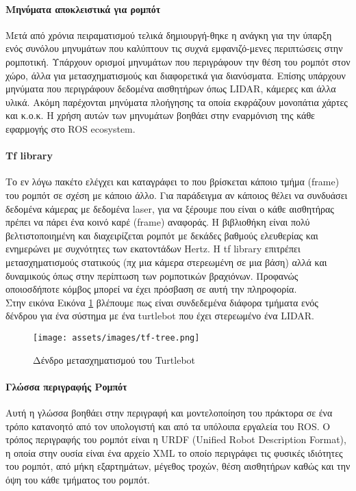 \paragraph{Μηνύματα αποκλειστικά για ρομπότ}
	Μετά από χρόνια πειραματισμού τελικά δημιουργή-θηκε η ανάγκη για την ύπαρξη ενός 
συνόλου μηνυμάτων που καλύπτουν τις συχνά εμφανιζό-μενες περιπτώσεις στην ρομποτική. Υπάρχουν ορισμοί μηνυμάτων που περιγράφουν την θέση του ρομπότ στον χώρο, άλλα για μετασχηματισμούς και διαφορετικά για διανύσματα. Επίσης υπάρχουν μηνύματα που περιγράφουν δεδομένα αισθητήρων όπως LIDAR, κάμερες και άλλα υλικά. Ακόμη παρέχονται μηνύματα πλοήγησης τα οποία εκφράζουν μονοπάτια χάρτες και κ.ο.κ. Η χρήση αυτών των μηνυμάτων βοηθάει στην εναρμόνιση της κάθε εφαρμογής στο ROS ecosystem. \\


\paragraph{Tf library} 
Το εν λόγω πακέτο ελέγχει και καταγράφει το που βρίσκεται κάποιο τμήμα (frame) του ρομπότ σε σχέση με κάποιο άλλο. Για παράδειγμα αν κάποιος θέλει να συνδυάσει δεδομένα κάμερας με δεδομένα laser, για να ξέρουμε που είναι ο κάθε αισθητήρας πρέπει να πάρει ένα κοινό καρέ (frame) αναφοράς. 
Η βιβλιοθήκη είναι πολύ βελτιστοποιημένη και διαχειρίζεται ρομπότ με δεκάδες βαθμούς ελευθερίας και ενημερώνει με συχνότητες των εκατοντάδων Hertz. Η tf library επιτρέπει μετασχηματισμούς στατικούς (πχ μια κάμερα στερεωμένη σε μια βάση) αλλά και δυναμικούς όπως στην περίπτωση των ρομποτικών βραχιόνων. Προφανώς οποιοσδήποτε κόμβος μπορεί να έχει πρόσβαση σε αυτή την πληροφορία.\\
Στην εικόνα Εικόνα \ref{fig:turtlebot tf} βλέπουμε πως είναι συνδεδεμένα διάφορα τμήματα ενός δένδρου για ένα σύστημα με ένα turtlebot που έχει στερεωμένο ένα LIDAR.
\begin{figure}[!ht]
	\centering
	\texttt{[image: assets/images/tf-tree.png]}
	\caption{Δένδρο μετασχηματισμού του Turtlebot}
	\label{fig:turtlebot tf}
\end{figure}

\paragraph{Γλώσσα περιγραφής Ρομπότ} 
	Αυτή η γλώσσα βοηθάει στην περιγραφή και μοντελοποίηση του πράκτορα σε ένα τρόπο 
κατανοητό από τον υπολογιστή και από τα υπόλοιπα εργαλεία του ROS. Ο τρόπος περιγραφής του ρομπότ είναι η URDF (Unified Robot Description Format), η οποία στην ουσία είναι ένα αρχείο XML το οποίο περιγράφει τις φυσικές ιδιότητες του ρομπότ, από μήκη εξαρτημάτων, μέγεθος τροχών, θέση αισθητήρων καθώς και την όψη του κάθε τμήματος του ρομπότ. \\

